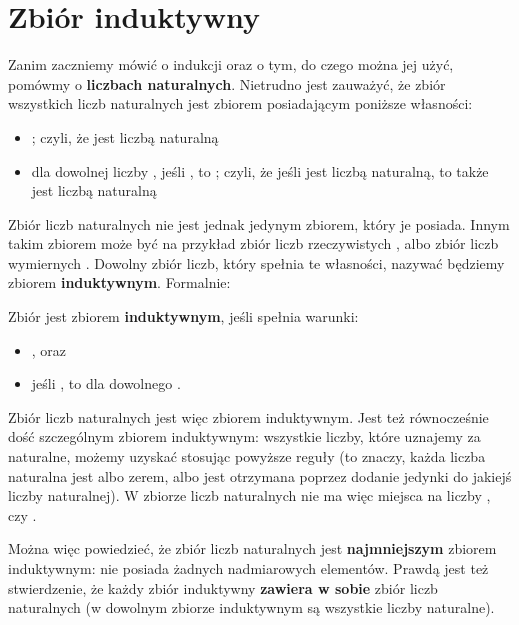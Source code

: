 \section{Zbiór induktywny}

Zanim zaczniemy mówić o indukcji oraz o tym, do czego można jej użyć, pomówmy o \textbf{liczbach naturalnych}. Nietrudno jest zauważyć, że zbiór  wszystkich liczb naturalnych jest zbiorem posiadającym poniższe własności:

\begin{itemize}
    \item {}; czyli, że  jest liczbą naturalną
    \item dla dowolnej liczby , jeśli , to ; czyli, że jeśli  jest liczbą naturalną, to  także jest liczbą naturalną
\end{itemize}

Zbiór liczb naturalnych nie jest jednak jedynym zbiorem, który je posiada. Innym takim zbiorem może być na przykład zbiór liczb rzeczywistych , albo zbiór liczb wymiernych . Dowolny zbiór liczb, który spełnia te własności, nazywać będziemy zbiorem \textbf{induktywnym}. Formalnie:

\begin{definition}
Zbiór  jest zbiorem \textbf{induktywnym}, jeśli spełnia warunki:
\begin{itemize}
    \item {}, oraz
    \item jeśli , to  dla dowolnego .
\end{itemize}
\label{definition:inductive}
\end{definition}

Zbiór liczb naturalnych  jest więc zbiorem induktywnym. Jest też równocześnie dość szczególnym zbiorem induktywnym: wszystkie liczby, które uznajemy za naturalne, możemy uzyskać stosując powyższe reguły (to znaczy, każda liczba naturalna jest albo zerem, albo jest otrzymana poprzez dodanie jedynki do jakiejś liczby naturalnej). W zbiorze liczb naturalnych nie ma więc miejsca na liczby ,  czy .

Można więc powiedzieć, że zbiór liczb naturalnych  jest \textbf{najmniejszym} zbiorem induktywnym: nie posiada żadnych nadmiarowych elementów. Prawdą jest też stwierdzenie, że każdy zbiór induktywny \textbf{zawiera w sobie} zbiór liczb naturalnych (w dowolnym zbiorze induktywnym są wszystkie liczby naturalne).


